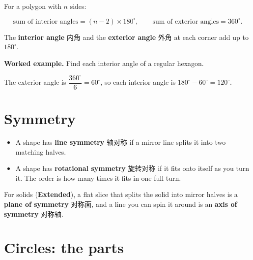\documentclass[11pt]{article}
\begin{document}
For a polygon with $n$ sides:

\[
\text{sum of interior angles} = (n - 2) \times 180^{\circ}, \qquad \text{sum of exterior angles} = 360^{\circ}.
\]

The \textbf{interior angle} 内角 and the \textbf{exterior angle} 外角 at each corner add up to $180^{\circ}$.

\textbf{Worked example.} Find each interior angle of a regular hexagon.

The exterior angle is $\dfrac{360^{\circ}}{6} = 60^{\circ}$, so each interior angle is $180^{\circ} - 60^{\circ} = 120^{\circ}$.

\section*{Symmetry}

\begin{itemize}
\item A shape has \textbf{line symmetry} 轴对称 if a mirror line splits it into two matching halves.

\item A shape has \textbf{rotational symmetry} 旋转对称 if it fits onto itself as you turn it. The order is how many times it fits in one full turn.

\end{itemize}

For solids (\textbf{Extended}), a flat slice that splits the solid into mirror halves is a \textbf{plane of symmetry} 对称面, and a line you can spin it around is an \textbf{axis of symmetry} 对称轴.

\section*{Circles: the parts}
\end{document}
